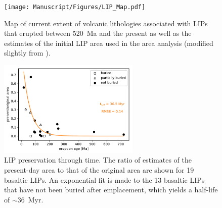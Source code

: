 \documentclass[11pt,letterpaper]{article}
\begin{document}
\begin{figure}[h!]
\begin{center}
	\texttt{[image: Manuscript/Figures/LIP\_Map.pdf]}
	\caption{Map of current extent of volcanic lithologies associated with LIPs that erupted between 520~Ma and the present as well as the estimates of the initial LIP area used in the area analysis (modified slightly from \citealp{Ernst2017a}).}
	\label{fig:LIP_map}
\end{center}
\end{figure}

\begin{figure}[h!]
\begin{center}
	\includegraphics[width=0.6\textwidth]{Manuscript/Figures/LIP_Preservation.pdf}
	\caption{LIP preservation through time. The ratio of estimates of the present-day area to that of the original area are shown for 19 basaltic LIPs. An exponential fit is made to the 13 basaltic LIPs that have not been buried after emplacement, which yields a half-life of $\sim$36~Myr.}
	\label{fig:LIP_preservation}
\end{center}
\end{figure}
\end{document}
